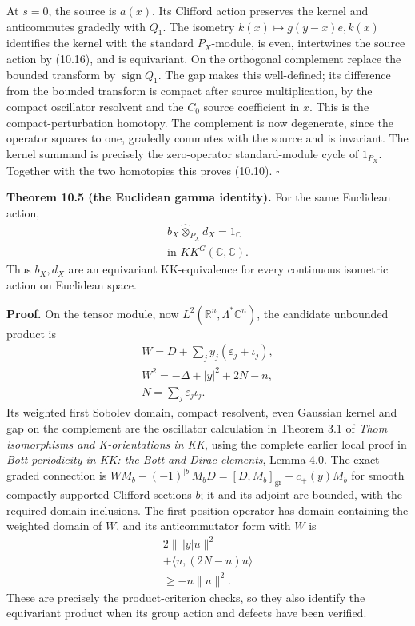 \documentclass[
  11pt,
]{article}
\begin{document}
At \(s=0\), the source is \(a(x)\). Its Clifford action preserves the
kernel and anticommutes gradedly with \(Q_1\). The isometry
\(k(x)\mapsto g(y-x)e,k(x)\) identifies the kernel with the standard
\(P_X\)-module, is even, intertwines the source action by (10.16), and
is equivariant. On the orthogonal complement replace the bounded
transform by \(\operatorname{sign}Q_1\). The gap makes this
well-defined; its difference from the bounded transform is compact after
source multiplication, by the compact oscillator resolvent and the
\(C_0\) source coefficient in \(x\). This is the compact-perturbation
homotopy. The complement is now degenerate, since the operator squares
to one, gradedly commutes with the source and is invariant. The kernel
summand is precisely the zero-operator standard-module cycle of
\(1_{P_X}\). Together with the two homotopies this proves (10.10).
\(\square\)

\textbf{Theorem 10.5 (the Euclidean gamma identity).} For the same
Euclidean action, \[
\begin{gathered}
b_X\widehat\otimes_{P_X}d_X=1_{\mathbb C}\\
\text{in }KK^G(\mathbb C,\mathbb C).
\end{gathered}
\tag{10.18}
\] Thus \(b_X,d_X\) are an equivariant KK-equivalence for every
continuous isometric action on Euclidean space.

\textbf{Proof.} On the tensor module, now
\(L^2(\mathbb R^n,\Lambda^*\mathbb C^n)\), the candidate unbounded
product is \[
\begin{gathered}
W=D+\sum_j y_j(\varepsilon_j+\iota_j),\\
W^2=-\Delta+|y|^2+2N-n,\\
N=\sum_j\varepsilon_j\iota_j.
\end{gathered}
\tag{10.19}
\] Its weighted first Sobolev domain, compact resolvent, even Gaussian
kernel and gap on the complement are the oscillator calculation in
Theorem 3.1 of \emph{Thom isomorphisms and K-orientations in KK}, using
the complete earlier local proof in \emph{Bott periodicity in KK: the
Bott and Dirac elements}, Lemma 4.0. The exact graded connection is
\(W M_b-(-1)^{|b|}M_bD=[D,M_b]_{\mathrm{gr}}+c_+(y)M_b\) for smooth
compactly supported Clifford sections \(b\); it and its adjoint are
bounded, with the required domain inclusions. The first position
operator has domain containing the weighted domain of \(W\), and its
anticommutator form with \(W\) is \[
\begin{gathered}
2\|\,|y|u\|^2\\
+\langle u,(2N-n)u\rangle\\
\geq-n\|u\|^2.
\end{gathered}
\tag{10.20}
\] These are precisely the product-criterion checks, so they also
identify the equivariant product when its group action and defects have
been verified.
\end{document}
